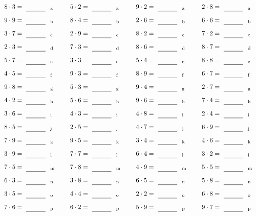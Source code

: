 \documentclass
[
  draft    = true,
  fontsize = 11pt,
  parskip  = half-
]
{scrartcl}
\begin{document}
\par\vfill\par
\begin{align*}
    \pline{8\cdot3}&=\rline{a}
  & \pline{5\cdot2}&=\rline{a}
  & \pline{9\cdot2}&=\rline{a}
  & \pline{2\cdot8}&=\rline{a} \\[1ex]
    \pline{9\cdot9}&=\rline{b}
  & \pline{8\cdot4}&=\rline{b}
  & \pline{2\cdot6}&=\rline{b}
  & \pline{6\cdot6}&=\rline{b} \\[1ex]
    \pline{3\cdot7}&=\rline{c}
  & \pline{2\cdot9}&=\rline{c}
  & \pline{8\cdot2}&=\rline{c}
  & \pline{7\cdot2}&=\rline{c} \\[1ex]
    \pline{2\cdot3}&=\rline{d}
  & \pline{7\cdot3}&=\rline{d}
  & \pline{8\cdot6}&=\rline{d}
  & \pline{8\cdot7}&=\rline{d} \\[1ex]
    \pline{5\cdot7}&=\rline{e}
  & \pline{3\cdot3}&=\rline{e}
  & \pline{5\cdot4}&=\rline{e}
  & \pline{8\cdot8}&=\rline{e} \\[1ex]
    \pline{4\cdot5}&=\rline{f}
  & \pline{9\cdot3}&=\rline{f}
  & \pline{8\cdot9}&=\rline{f}
  & \pline{6\cdot7}&=\rline{f} \\[1ex]
    \pline{9\cdot8}&=\rline{g}
  & \pline{5\cdot3}&=\rline{g}
  & \pline{9\cdot4}&=\rline{g}
  & \pline{2\cdot7}&=\rline{g} \\[1ex]
    \pline{4\cdot2}&=\rline{h}
  & \pline{5\cdot6}&=\rline{h}
  & \pline{9\cdot6}&=\rline{h}
  & \pline{7\cdot4}&=\rline{h} \\[1ex]
    \pline{3\cdot6}&=\rline{i}
  & \pline{4\cdot3}&=\rline{i}
  & \pline{4\cdot8}&=\rline{i}
  & \pline{2\cdot4}&=\rline{i} \\[1ex]
    \pline{8\cdot5}&=\rline{j}
  & \pline{2\cdot5}&=\rline{j}
  & \pline{4\cdot7}&=\rline{j}
  & \pline{6\cdot9}&=\rline{j} \\[1ex]
    \pline{7\cdot9}&=\rline{k}
  & \pline{9\cdot5}&=\rline{k}
  & \pline{3\cdot4}&=\rline{k}
  & \pline{4\cdot6}&=\rline{k} \\[1ex]
    \pline{3\cdot9}&=\rline{l}
  & \pline{7\cdot7}&=\rline{l}
  & \pline{6\cdot4}&=\rline{l}
  & \pline{3\cdot2}&=\rline{l} \\[1ex]
    \pline{7\cdot5}&=\rline{m}
  & \pline{7\cdot8}&=\rline{m}
  & \pline{4\cdot9}&=\rline{m}
  & \pline{5\cdot5}&=\rline{m} \\[1ex]
    \pline{6\cdot3}&=\rline{n}
  & \pline{3\cdot8}&=\rline{n}
  & \pline{6\cdot5}&=\rline{n}
  & \pline{5\cdot8}&=\rline{n} \\[1ex]
    \pline{3\cdot5}&=\rline{o}
  & \pline{4\cdot4}&=\rline{o}
  & \pline{2\cdot2}&=\rline{o}
  & \pline{6\cdot8}&=\rline{o} \\[1ex]
    \pline{7\cdot6}&=\rline{p}
  & \pline{6\cdot2}&=\rline{p}
  & \pline{5\cdot9}&=\rline{p}
  & \pline{9\cdot7}&=\rline{p}
\end{align*}
\end{document}

